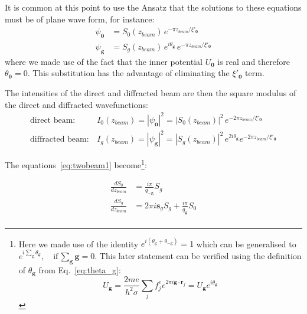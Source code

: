 It is common at this point to use the Ansatz that the solutions to these equations must be of plane wave form, for instance:
\begin{equation}
\begin{split}
     \psi_{\mathbf{0}} &= S_0(z_{beam}) \, e^{-\pi z_{beam}/\xi'_{\mathbf{0}} }\\
    \psi_{\mathbf{g}} &= S_g(z_{beam})\,  e^{i \theta_{\mathbf{g}}} \, e^{-\pi z_{beam}/\xi'_{\mathbf{0}} }
\end{split}
\end{equation}
where we made use of the fact that the inner potential $U_\mathbf{0}$ is real and therefore $\theta_\mathbf{0} = 0$. This substitution has the advantage of eliminating the $\xi'_{\mathbf{0}}$ term. 

The intensities of the direct and diffracted beam are then the square modulus of the direct and diffracted wavefunctions:
\begin{equation}
    \begin{split}
        \text{direct beam:}& \, I_0(z_{beam})=  |\psi_{\mathbf{0}}|^2 =  |S_0(z_{beam})|^2 \, e^{-2 \pi z_{beam}/\xi'_{\mathbf{0}} } \\
        \text{diffracted beam:}& \, I_g(z_{beam})=  |\psi_{\mathbf{g}}|^2 =  |S_g(z_{beam})|^2 \,  e^{2 i \theta_{\mathbf{g}}} e^{-2 \pi z_{beam}/\xi'_{\mathbf{0}} } 
    \end{split}
\end{equation}


The equations~\ref{eq:twobeam1} become\footnote{ Here we made use of the identity $e^{i(\theta_{\mathbf{g}} +  \theta_{\mathbf{-g}})} = 1$ which can be generalised to $e^{i \sum_{\mathbf{g}} \theta_{\mathbf{g}}}, \quad \text{if} \, \sum_{\mathbf{g}} \mathbf{g} = 0$. This later statement can be verified using the definition of $\theta_{\mathbf{g}}$ from Eq.~\ref{eq:theta_g}:
\begin{equation*}
    U_{\mathbf{g}} = \frac{2 m e}{h^2 \sigma} \sum_j f^e_j e^{2\pi i \mathbf{g} \cdot \mathbf{r}_j} = U_{\mathbf{g}} e^{i \theta_{\textbf{g}}}
\end{equation*}
}:

\begin{equation}
\label{eq:ODEs}
    \begin{split}
        \frac{d S_0}{d z_{beam}} & = \frac{i \pi}{q_{-\mathbf{g}}} S_g \\
        \frac{d S_g}{d z_{beam}} & = 2 \pi i \mathbf{s}_g S_g +  \frac{i \pi}{q_{\mathbf{g}}} S_0 \\
    \end{split}
\end{equation}


